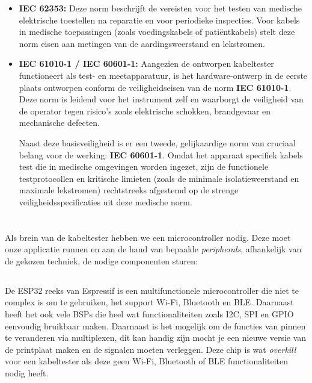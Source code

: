 \begin{itemize}
    \item \textbf{\gls{IEC} 62353\autocite{IEC62353}:} Deze norm beschrijft de vereisten voor het testen van medische elektrische toestellen na reparatie en voor periodieke inspecties. Voor kabels in medische toepassingen (zoals voedingskabels of patiëntkabels) stelt deze norm eisen aan metingen van de aardingsweerstand en lekstromen.
    
    \item \textbf{\gls{IEC} 61010-1 / \gls{IEC} 60601-1\autocite{IEC61010-1, IEC60601-1}:} Aangezien de ontworpen kabeltester functioneert als test- en meetapparatuur, is het hardware-ontwerp in de eerste plaats ontworpen conform de veiligheidseisen van de norm \textbf{\gls{IEC} 61010-1}. Deze norm is leidend voor het instrument zelf en waarborgt de veiligheid van de operator tegen risico’s zoals elektrische schokken, brandgevaar en mechanische defecten. 
    
    Naast deze basisveiligheid is er een tweede, gelijkaardige norm van cruciaal belang voor de werking: \textbf{\gls{IEC} 60601-1}. Omdat het apparaat specifiek kabels test die in medische omgevingen worden ingezet, zijn de functionele testprotocollen en kritische limieten (zoals de minimale isolatieweerstand en maximale lekstromen) rechtstreeks afgestemd op de strenge veiligheidsspecificaties uit deze medische norm.
\end{itemize}

\section{}%
\label{sec:µC}

Als brein van de kabeltester hebben we een microcontroller nodig. Deze moet onze applicatie runnen en aan de hand van bepaalde \textit{peripherals}, afhankelijk van de gekozen techniek, de nodige componenten sturen:

\subsection{}%
\label{ssec:ESP32}

De ESP32 reeks van Espressif \autocite{EspressifSystems2026} is een multifunctionele microcontroller die niet te complex is om te gebruiken, het support Wi-Fi, Bluetooth en \gls{BLE}. Daarnaast heeft het ook vele \glspl{BSP} die heel wat functionaliteiten zoals \gls{I2C}, \gls{SPI} en \gls{GPIO} eenvoudig bruikbaar maken. Daarnaast is het mogelijk om de functies van pinnen te veranderen via multiplexen, dit kan handig zijn mocht je een nieuwe versie van de printplaat maken en de signalen moeten verleggen. Deze chip is wat \textit{overkill} voor een kabeltester als deze geen Wi-Fi, Bluetooth of \gls{BLE} functionaliteiten nodig heeft.

